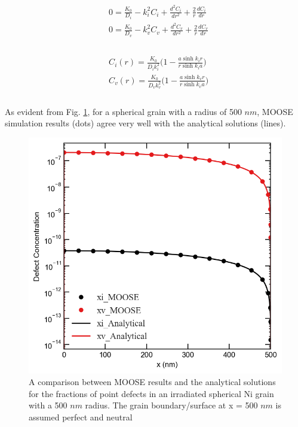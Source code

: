 \documentclass[utf8]{frontiersSCNS} %
\begin{document}
    \begin{equation}
        \begin{aligned}
          &0 = \frac{K_0}{D_i} - k_i^2C_i + \frac{d^2C_i}{dr^2}+\frac{2}{r}\frac{dC_i}{dr}\\
          &0 = \frac{K_0}{D_v} - k_v^2C_v + \frac{d^2C_v}{dr^2}+\frac{2}{r}\frac{dC_v}{dr}\\
        \end{aligned}
        \label{equation:spherical_norecomb_point_defect_equations}
    \end{equation}
    \\
    \begin{equation}
        \begin{aligned}
          &C_i(r)=\frac{K_0}{D_ik_i^2}\bigg(1-\frac{a\sinh{k_ir}}{r\sinh{k_ia}}\bigg)\\
          &C_v(r)=\frac{K_0}{D_vk_v^2}\bigg(1-\frac{a\sinh{k_vr}}{r\sinh{k_va}}\bigg)\\
        \end{aligned}
        \label{equation:spherical_grain_analytical_solution}
    \end{equation}\\
    As evident from Fig. \ref{figure:concentrations_MOOSE_analytical}, for a spherical grain with a radius of 500 $nm$, MOOSE simulation results (dots) agree very well with the analytical solutions (lines). 
 
    \begin{figure}[h!]
        \centering
        \includegraphics[scale=0.55]{Fig1}
        \caption{A comparison between MOOSE results and the analytical solutions for the fractions of point defects in an irradiated spherical Ni grain with a 500 $nm$ radius. The grain boundary/surface at x = 500 $nm$ is assumed perfect and neutral}
        \label{figure:concentrations_MOOSE_analytical}
    \end{figure}
\end{document}
